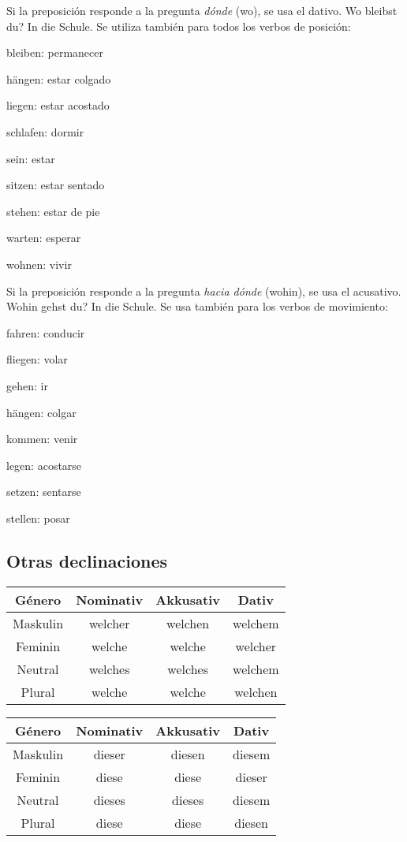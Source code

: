 Si la preposición responde a la pregunta \textit{dónde} (wo), se usa el dativo. Wo bleibst du? In die Schule. Se utiliza también para todos los verbos de posición:
\begin{myitemize}
\item bleiben: permanecer
\item hängen: estar colgado
\item liegen: estar acostado
\item schlafen: dormir
\item sein: estar
\item sitzen: estar sentado
\item stehen: estar de pie
\item warten: esperar
\item wohnen: vivir
\end{myitemize}

Si la preposición responde a la pregunta \textit{hacia dónde} (wohin), se usa el acusativo. Wohin gehst du? In die Schule. Se usa también para los verbos de movimiento:
\begin{myitemize}
\item fahren: conducir
\item fliegen: volar
\item gehen: ir
\item hängen: colgar
\item kommen: venir
\item legen: acostarse
\item setzen: sentarse
\item stellen: posar
\end{myitemize}

\subsection{Otras declinaciones}
\begin{tabular}{|c | c | c | c |}
\hline
\textbf{Género} & \textbf{Nominativ} & \textbf{Akkusativ} & \textbf{Dativ}\\
\hline
Maskulin & welcher & welchen & welchem  \\
Feminin  & welche  &  welche & welcher \\
Neutral  & welches & welches & welchem \\
Plural   & welche  & welche  & welchen \\
\hline
\end{tabular}

\begin{tabular}{|c | c | c | c |}
\hline
\textbf{Género} & \textbf{Nominativ} & \textbf{Akkusativ} & \textbf{Dativ}\\
\hline
Maskulin & dieser & diesen & diesem  \\
Feminin  & diese  & diese  & dieser \\
Neutral  & dieses & dieses & diesem \\
Plural   & diese  & diese  & diesen \\
\hline
\end{tabular}

